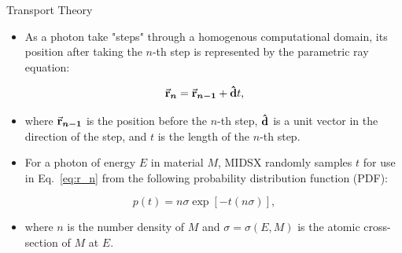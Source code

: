 \documentclass[final]{beamer}
\newlength{\colwidth}
\begin{document}
\begin{frame}[t]
\begin{columns}[t]
\begin{column}{\colwidth}
  \begin{block}{Transport Theory}
    \vspace{-0.4\baselineskip}
    \begin{itemize}[label=\textbullet]
      \item As a photon take "steps" through a homogenous computational domain, its position after taking the $n$-th step is represented by the parametric ray equation:
    \end{itemize}
    \begin{equation} \label{eq:r_n}
        \va{r}_{\bm{n}} = \va{r}_{\bm{n-1}} + \vu{d}t,
    \end{equation}
    \begin{itemize}[label={}]
      \item where $\va{r}_{\bm{n-1}}$ is the position before the $n$-th step, $\vu{d}$ is a unit vector in the direction of the step, and $t$ is the length of the $n$-th step.
    \end{itemize}
    \begin{itemize}[label=\textbullet]
      \item For a photon of energy $E$ in material $M$, MIDSX randomly samples $t$ for use in Eq.~\ref{eq:r_n} from the following probability distribution function (PDF):
    \end{itemize}
    \begin{equation} \label{eq:pdf}
      p(t) = n\sigma \exp\left[-t(n\sigma)\right],
    \end{equation}
    \begin{itemize}[label={}]
      \item where $n$ is the number density of $M$ and $\sigma = \sigma(E, M)$ is the atomic cross-section of $M$ at $E$.
    \end{itemize}


\end{block}
\end{column}
\end{columns}
\end{frame}
\end{document}
